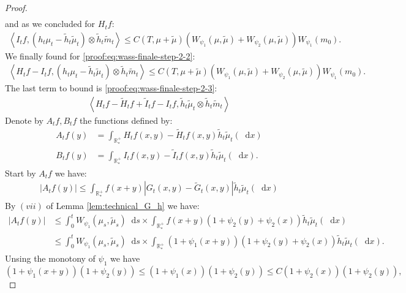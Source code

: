 \documentclass[11pt,a4paper]{article}
\newcommand{\RRP}{\mathbb{R}^+_*}
\newcommand{\brac}[1]{\left\langle#1\right\rangle}
\newcommand{\dd}{\mathop{}\!\mathrm{d}}
\begin{document}
\begin{proof}
\begin{align*}
    \end{align*}
    and as we concluded for $H_tf$:
    \begin{align*}
        \brac{I_tf,\left(h_t\mu_t - \tilde{h}_t\tilde{\mu}_t\right)\otimes \tilde{h}_t\tilde{m}_t}  \leq C(T,\mu + \tilde{\mu})\left(W_{\psi_1}\left( \mu , \tilde{\mu}\right) + W_{\psi_2}\left( \mu , \tilde{\mu}\right)\right)W_{\psi_1}\left(m_0\right).
    \end{align*}
    We finally found for \eqref{proof:eq:wass-finale-step-2-2}:
    \begin{align*}
        \brac{H_tf - I_tf,\left(h_t\mu_t - \tilde{h}_t\tilde{\mu}_t\right)\otimes \tilde{h}_t\tilde{m}_t}  \leq C(T,\mu + \tilde{\mu})\left(W_{\psi_1}\left( \mu , \tilde{\mu}\right) + W_{\psi_2}\left( \mu , \tilde{\mu}\right)\right)W_{\psi_1}\left(m_0\right).
    \end{align*}
    The last term to bound is \eqref{proof:eq:wass-finale-step-2-3}:
    \begin{align*}
        \brac{H_tf-\tilde{H}_tf + \tilde{I}_tf - I_tf,\tilde{h}_t\tilde{\mu}_t\otimes \tilde{h}_t\tilde{m}_t}
    \end{align*}
    Denote by $A_tf, B_tf$ the functions defined by:
    \begin{align*}
        A_tf(y) &= \int_{\RRP} H_tf(x,y)-\tilde{H}_tf(x,y)  \tilde{h}_t\tilde{\mu}_t(\dd x) \\
        B_tf(y) &= \int_{\RRP} I_tf(x,y)-\tilde{I}_tf(x,y)  \tilde{h}_t\tilde{\mu}_t(\dd x).
    \end{align*}
    Start by $A_tf$ we have:
    \begin{align*}
        \left|A_tf(y)\right| \leq \int_{\RRP} f(x+y) \left|G_t(x,y) - \tilde{G}_t(x,y) \right| \tilde{h}_t\tilde{\mu}_t(\dd x)
    \end{align*}
    By $(vii)$ of Lemma \ref{lem:technical_G_h} we have:
    \begin{align*}
        \left|A_tf(y)\right| 
        &\leq \int_0^t W_{\psi_1}(\mu_s,\tilde{\mu}_s) \dd s \times \int_{\RRP} f(x+y)\left(1 + \psi_2(y) + \psi_2(x) \right) \tilde{h}_t\tilde{\mu}_t(\dd x) \\
        &\leq \int_0^t W_{\psi_1}(\mu_s,\tilde{\mu}_s) \dd s \times \int_{\RRP} (1 + \psi_1(x+y))\left(1 + \psi_2(y) + \psi_2(x) \right) \tilde{h}_t\tilde{\mu}_t(\dd x).
    \end{align*}
    Unsing the monotony of $\psi_1$ we have 
    \[(1 + \psi_1(x+y) )(1 +\psi_2(y)) \leq (1 + \psi_1(x) )(1 + \psi_2(y)) \leq C(1 + \psi_2(x))(1 + \psi_2(y)),
    \]

\end{proof}
\end{document}
